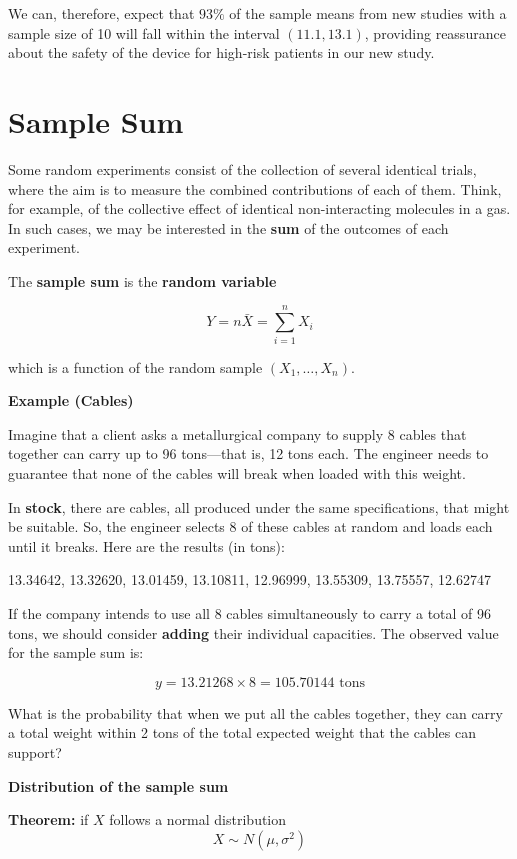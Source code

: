 \documentclass[
]{book}
\begin{document}
We can, therefore, expect that \(93\%\) of the sample means from new studies with a sample size of 10 will fall within the interval \((11.1, 13.1)\), providing reassurance about the safety of the device for high-risk patients in our new study.

\hypertarget{sample-sum}{%
\section{Sample Sum}\label{sample-sum}}

Some random experiments consist of the collection of several identical trials, where the aim is to measure the combined contributions of each of them. Think, for example, of the collective effect of identical non-interacting molecules in a gas. In such cases, we may be interested in the \textbf{sum} of the outcomes of each experiment.

The \textbf{sample sum} is the \textbf{random variable}

\[
Y = n \bar{X} = \sum_{i=1}^n X_i
\]

which is a function of the random sample \((X_1, \ldots, X_n)\).

\textbf{Example (Cables)}

Imagine that a client asks a metallurgical company to supply 8 cables that together can carry up to 96 tons---that is, 12 tons each. The engineer needs to guarantee that none of the cables will break when loaded with this weight.

In \textbf{stock}, there are cables, all produced under the same specifications, that might be suitable. So, the engineer selects 8 of these cables at random and loads each until it breaks. Here are the results (in tons):

13.34642, 13.32620, 13.01459, 13.10811, 12.96999, 13.55309, 13.75557, 12.62747

If the company intends to use all 8 cables simultaneously to carry a total of 96 tons, we should consider \textbf{adding} their individual capacities. The observed value for the sample sum is:

\[
y = 13.21268 \times 8 = 105.70144 \text{ tons}
\]

What is the probability that when we put all the cables together, they can carry a total weight within 2 tons of the total expected weight that the cables can support?

\textbf{Distribution of the sample sum}

\textbf{Theorem:} if \(X\) follows a normal distribution
\[X \sim N(\mu, \sigma^2)\]
\end{document}
